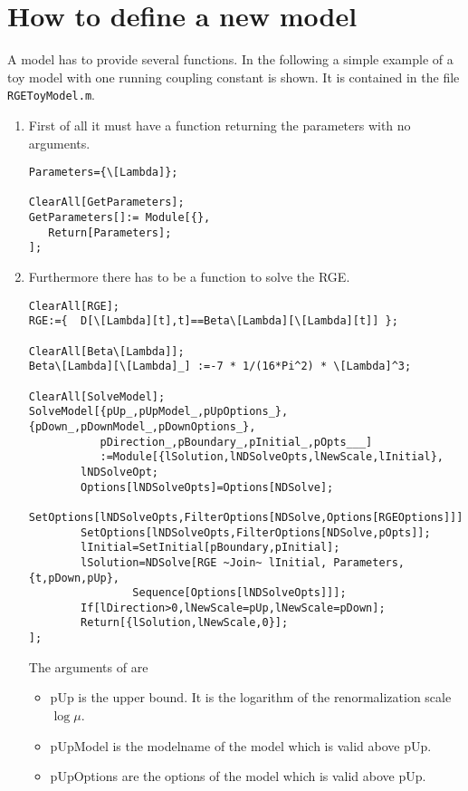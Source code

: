 
\section{How to define a new model}

A model has to provide several functions.  In the following a simple example of
a toy model with one running coupling constant is shown.  It is contained in the
file \texttt{RGEToyModel.m}.


\begin{enumerate}
  \item First of all it must have a function returning the parameters with no arguments.
\begin{verbatim}
Parameters={\[Lambda]};

ClearAll[GetParameters];
GetParameters[]:= Module[{},
   Return[Parameters];
];
\end{verbatim}

\item Furthermore there has to be a function to solve the RGE.

\begin{verbatim}
ClearAll[RGE];
RGE:={  D[\[Lambda][t],t]==Beta\[Lambda][\[Lambda][t]] };

ClearAll[Beta\[Lambda]];
Beta\[Lambda][\[Lambda]_] :=-7 * 1/(16*Pi^2) * \[Lambda]^3;

ClearAll[SolveModel];
SolveModel[{pUp_,pUpModel_,pUpOptions_},{pDown_,pDownModel_,pDownOptions_},
           pDirection_,pBoundary_,pInitial_,pOpts___]
           :=Module[{lSolution,lNDSolveOpts,lNewScale,lInitial},
        lNDSolveOpt;
        Options[lNDSolveOpts]=Options[NDSolve];
        SetOptions[lNDSolveOpts,FilterOptions[NDSolve,Options[RGEOptions]]];
        SetOptions[lNDSolveOpts,FilterOptions[NDSolve,pOpts]];
        lInitial=SetInitial[pBoundary,pInitial];
        lSolution=NDSolve[RGE ~Join~ lInitial, Parameters,{t,pDown,pUp},
                Sequence[Options[lNDSolveOpts]]];
        If[lDirection>0,lNewScale=pUp,lNewScale=pDown];
        Return[{lSolution,lNewScale,0}];
];
\end{verbatim}

  The arguments of  are
  \begin{itemize}
    \item pUp is the upper bound. It is the logarithm of the renormalization scale $\log\mu$.
    \item pUpModel is the modelname of the model which is valid above pUp.
    \item pUpOptions are the options of the model which is valid above pUp.
      

\end{itemize}
\end{enumerate}
